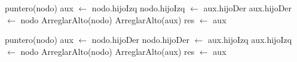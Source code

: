 \begin{Algoritmos}
	\begin{algorithm}[H]
		\NoCaptionOfAlgo
		\caption{}
		puntero(nodo) aux $\leftarrow$ nodo.hijoIzq\;
		nodo.hijoIzq $\leftarrow$ aux.hijoDer\;
		aux.hijoDer $\leftarrow$ nodo\;
		ArreglarAlto(nodo)\;
		ArreglarAlto(aux)\;
		res $\leftarrow$ aux\;
	\end{algorithm}

	\begin{algorithm}[H]
		\NoCaptionOfAlgo
		\caption{}
		puntero(nodo) aux $\leftarrow$ nodo.hijoDer\;
		nodo.hijoDer $\leftarrow$ aux.hijoIzq\;
		aux.hijoIzq $\leftarrow$ nodo\;
		ArreglarAlto(nodo)\;
		ArreglarAlto(aux)\;
		res $\leftarrow$ aux\;
	\end{algorithm}

\end{Algoritmos}